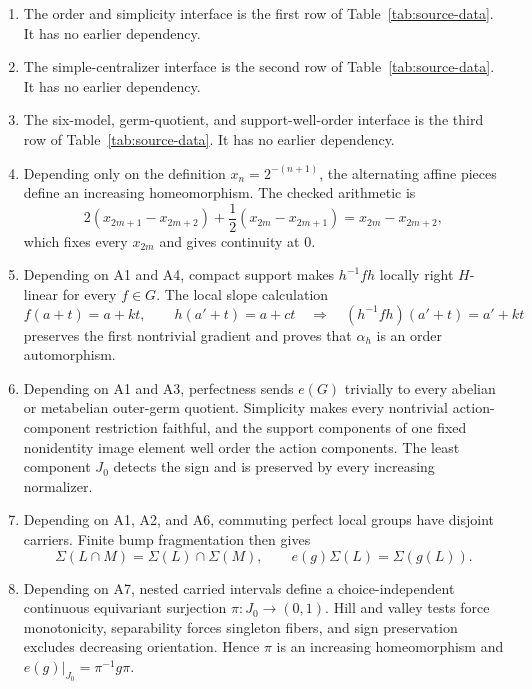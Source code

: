 \documentclass[11pt]{amsart}
\theoremstyle{definition}
\theoremstyle{remark}
\numberwithin{equation}{section}
\begin{document}
\begin{enumerate}
\item[\textup{A1}.] The order and simplicity interface is the first row of Table~\ref{tab:source-data}. It has no earlier dependency.

\item[\textup{A2}.] The simple-centralizer interface is the second row of Table~\ref{tab:source-data}. It has no earlier dependency.

\item[\textup{A3}.] The six-model, germ-quotient, and support-well-order interface is the third row of Table~\ref{tab:source-data}. It has no earlier dependency.

\item[\textup{A4}.] Depending only on the definition \(x_n=2^{-(n+1)}\), the alternating affine pieces define an increasing homeomorphism. The checked arithmetic is
\[
2(x_{2m+1}-x_{2m+2})
+\frac12(x_{2m}-x_{2m+1})
=x_{2m}-x_{2m+2},
\]
which fixes every \(x_{2m}\) and gives continuity at \(0\).

\item[\textup{A5}.] Depending on A1 and A4, compact support makes \(h^{-1}fh\) locally right \(H\)-linear for every \(f\in G\). The local slope calculation
\[
f(a+t)=a+kt,\qquad h(a'+t)=a+ct
\quad\Longrightarrow\quad
(h^{-1}fh)(a'+t)=a'+kt
\]
preserves the first nontrivial gradient and proves that \(\alpha_h\) is an order automorphism.

\item[\textup{A6}.] Depending on A1 and A3, perfectness sends \(e(G)\) trivially to every abelian or metabelian outer-germ quotient. Simplicity makes every nontrivial action-component restriction faithful, and the support components of one fixed nonidentity image element well order the action components. The least component \(J_0\) detects the sign and is preserved by every increasing normalizer.

\item[\textup{A7}.] Depending on A1, A2, and A6, commuting perfect local groups have disjoint carriers. Finite bump fragmentation then gives
\[
\Sigma(L\cap M)=\Sigma(L)\cap\Sigma(M),
\qquad
e(g)\Sigma(L)=\Sigma(g(L)).
\]

\item[\textup{A8}.] Depending on A7, nested carried intervals define a choice-independent continuous equivariant surjection \(\pi:J_0\to(0,1)\). Hill and valley tests force monotonicity, separability forces singleton fibers, and sign preservation excludes decreasing orientation. Hence \(\pi\) is an increasing homeomorphism and \(e(g)|_{J_0}=\pi^{-1}g\pi\).


\end{enumerate}
\end{document}

